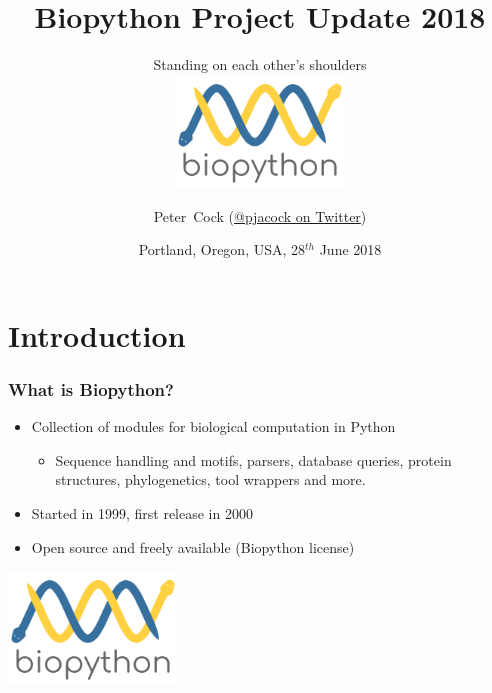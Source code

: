 

\usepackage{multicol}

\title[Biopython Project Update 2018] %
{Biopython Project Update 2018}
\subtitle{Standing on each other's shoulders \\ \includegraphics[height=3cm]{images/biopython_logo_m.png}}
\author[Cock] %
{Peter~Cock (\href{https://twitter.com/pjacock}{@pjacock on Twitter})}
\date[June 2018] %
{Portland, Oregon, USA, 28$^{th}$ June 2018}
\subject{Bioinformatics}





\frame[plain]{\titlepage}

\section{Introduction}

\begin{frame}
  \frametitle{What is Biopython?}

  \begin{itemize}
  \item Collection of modules for biological computation in Python
  \begin{itemize}
  \item Sequence handling and motifs, parsers, database queries, protein structures, phylogenetics, tool wrappers and more.
  \end{itemize}
  \item Started in 1999, first release in 2000
  \item Open source and freely available (Biopython license)
  \end{itemize}

\center
\includegraphics[height=3cm]{images/biopython_logo_m.png}

\end{frame}

